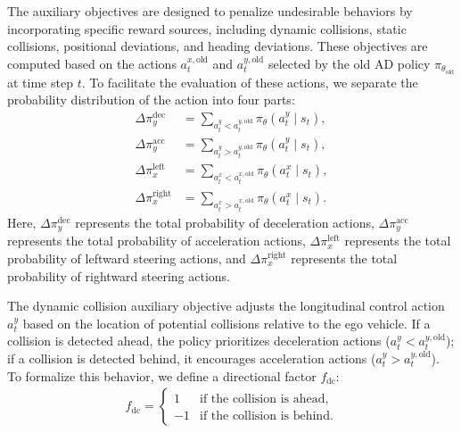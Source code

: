 The auxiliary objectives are designed to penalize undesirable behaviors by incorporating specific reward sources, including dynamic collisions, static collisions, positional deviations, and heading deviations. These objectives are computed based on the actions \( a_t^{x, \text{old}} \) and \( a_t^{y, \text{old}} \) selected by the old AD policy \( \pi_{\theta_{\text{old}}} \) at time step \( t \). To facilitate the evaluation of these actions, we separate the probability distribution of the action into four parts:
\begin{equation}
\begin{aligned}
\Delta \pi_y^{\text{dec}} &= \sum_{a_t^y < a_t^{y, \text{old}}} \pi_\theta(a_t^y \mid s_t), \\
\Delta \pi_y^{\text{acc}} &= \sum_{a_t^y > a_t^{y, \text{old}}} \pi_\theta(a_t^y \mid s_t), \\
\Delta \pi_x^{\text{left}} &= \sum_{a_t^x < a_t^{x, \text{old}}} \pi_\theta(a_t^x \mid s_t), \\
\Delta \pi_x^{\text{right}} &= \sum_{a_t^x > a_t^{x, \text{old}}} \pi_\theta(a_t^x \mid s_t).
\end{aligned}
\end{equation}
Here, \( \Delta \pi_y^{\text{dec}} \) represents the total probability of deceleration actions, \( \Delta \pi_y^{\text{acc}} \) represents the total probability of acceleration actions, \( \Delta \pi_x^{\text{left}} \) represents the total probability of leftward steering actions, and \( \Delta \pi_x^{\text{right}} \) represents the total probability of rightward steering actions.

The dynamic collision auxiliary objective adjusts the longitudinal control action \(a_t^y\) based on the location of potential collisions relative to the ego vehicle. If a collision is detected ahead, the policy prioritizes deceleration actions (\(a_t^y < a_t^{y, \text{old}}\)); if a collision is detected behind, it encourages acceleration actions (\(a_t^y > a_t^{y, \text{old}}\)). To formalize this behavior, we define a directional factor \(f_\text{dc}\):
\begin{equation}
\begin{aligned}
f_\text{dc} = \begin{cases} 
1 & \text{if the collision is ahead}, \\
-1 & \text{if the collision is behind}.
\end{cases} 
\end{aligned}
\end{equation}

